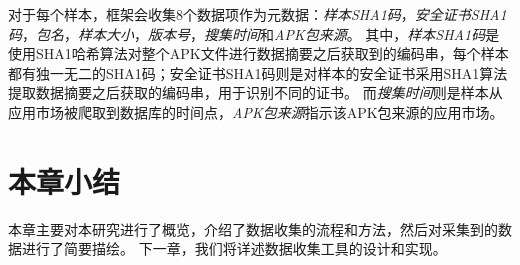 对于每个样本，框架会收集8个数据项作为元数据：\emph{样本SHA1码}，\emph{安全证书SHA1码}，\emph{包名}，\emph{样本大小}，\emph{版本号}，\emph{搜集时间}和\emph{APK包来源}。
其中，\emph{样本SHA1码}是使用SHA1哈希算法对整个APK文件进行数据摘要之后获取到的编码串，每个样本都有独一无二的SHA1码；安全证书SHA1码则是对样本的安全证书采用SHA1算法提取数据摘要之后获取的编码串，用于识别不同的证书。
而\emph{搜集时间}则是样本从应用市场被爬取到数据库的时间点，\emph{APK包来源}指示该APK包来源的应用市场。

\section{本章小结}

本章主要对本研究进行了概览，介绍了数据收集的流程和方法，然后对采集到的数据进行了简要描绘。
下一章，我们将详述数据收集工具\mytool 的设计和实现。
